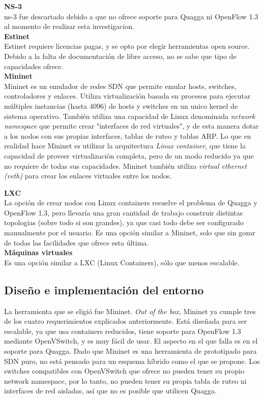 \textbf{NS-3}\\
ns-3 fue descartado debido a que no ofrece soporte para Quagga ni OpenFlow 1.3 al momento de realizar esta investigacion.\\

\textbf{Estinet}\\
Estinet requiere licencias pagas, y se opto por elegir herramientas open source. Debido a la falta de documentación de libre acceso, no se sabe que tipo de capacidades ofrece.\\

\textbf{Mininet}\\
Mininet es un emulador de redes SDN que permite emular hosts, switches, controladores y enlaces. Utiliza virtualización basada en procesos para ejecutar múltiples instancias (hasta 4096) de hosts y switches en un unico kernel de sistema operativo. También utiliza una capacidad de Linux denominada \textit{network namespace} que permite crear "interfaces de red virtuales", y de esta manera dotar a los nodos con sus propias interfaces, tablas de ruteo y tablas ARP. Lo que en realidad hace Mininet es utilizar la arquitectura \textit{Linux container}, que tiene la capacidad de proveer virtualización completa, pero de un modo reducido ya que no requiere de todas sus capacidades. Mininet también utiliza \textit{virtual ethernet (veth)} para crear los enlaces virtuales entre los nodos.


\textbf{LXC}\\
La opción de crear nodos con Linux containers resuelve el problema de Quagga y OpenFlow 1.3, pero llevaría una gran cantidad de trabajo construir distintas topologias (sobre todo si son grandes), ya que casi todo debe ser configurado manualmente por el usuario. Es una opción similar a Mininet, solo que sin gozar de todas las facilidades que ofrece esta última.\\


\textbf{Máquinas virtuales}\\
Es una opción similar a LXC (Linux Containers), sólo que menos escalable.
\\

\subsection{Diseño e implementación del entorno}
La herramienta que se eligió fue Mininet. \textit{Out of the box}, Mininet ya cumple tres de los cuatro requerimientos explicados anteriormente. Está diseñada para ser escalable, ya que usa containers reducidos, tiene soporte para OpenFlow 1.3 mediante OpenVSwitch, y es muy fácil de usar. El aspecto en el que falla es en el soporte para Quagga. Dado que Mininet es una herramienta de prototipado para SDN puro, no está pensado para un esquema híbrido como el que se propone. Los switches compatibles con OpenVSwitch que ofrece no pueden tener su propio network namespace, por lo tanto, no pueden tener su propia tabla de ruteo ni interfaces de red aisladas, así que no es posible que utilicen Quagga.

